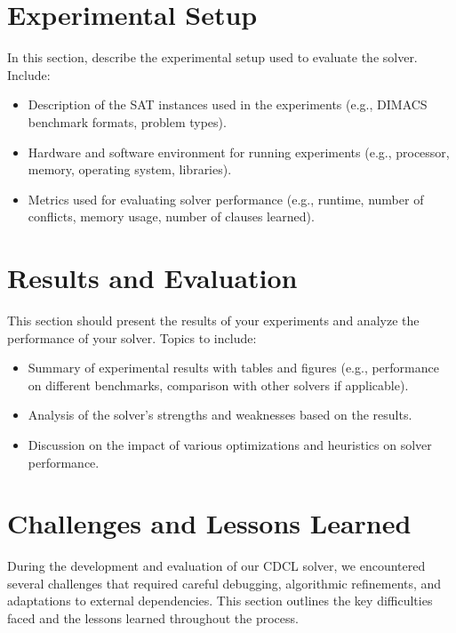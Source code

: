 \documentclass[a4paper,12pt]{article}
\begin{document}
\section{Experimental Setup}
\label{sec:experiment}
In this section, describe the experimental setup used to evaluate the solver. Include:
\begin{itemize}
    \item Description of the SAT instances used in the experiments (e.g., DIMACS benchmark formats, problem types).
    \item Hardware and software environment for running experiments (e.g., processor, memory, operating system, libraries).
    \item Metrics used for evaluating solver performance (e.g., runtime, number of conflicts, memory usage, number of clauses learned).
\end{itemize}

\section{Results and Evaluation}
\label{sec:results}
This section should present the results of your experiments and analyze the performance of your solver. Topics to include:
\begin{itemize}
    \item Summary of experimental results with tables and figures (e.g., performance on different benchmarks, comparison with other solvers if applicable).
    \item Analysis of the solver’s strengths and weaknesses based on the results.
    \item Discussion on the impact of various optimizations and heuristics on solver performance.
\end{itemize}

\section{Challenges and Lessons Learned}
\label{sec:challenges}

During the development and evaluation of our CDCL solver, we encountered several challenges that
required careful debugging, algorithmic refinements, and adaptations to external dependencies.
This section outlines the key difficulties faced and the lessons learned throughout the process.
\end{document}
